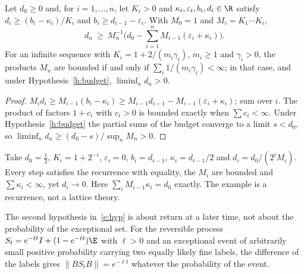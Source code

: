 \begin{corollary}[Accumulation]\label{c:acc}
Let $d_0\ge0$ and, for $i=1,\dots,n$, let $K_i>0$ and $\kappa_i,\varepsilon_i,b_i,d_i\in\R$ satisfy
$d_i\ge(b_i-\kappa_i)/K_i$ and $b_i\ge d_{i-1}-\varepsilon_i$. With $M_0=1$ and $M_i=K_1\cdots K_i$,
\[
d_n\ \ge\ M_n^{-1}\Big(d_0-\sum_{i=1}^nM_{i-1}(\varepsilon_i+\kappa_i)\Big).
\]
For an infinite sequence with $K_i=1+2/(m_i\gamma_i)$, $m_i\ge1$ and $\gamma_i>0$, the products $M_n$ are
bounded if and only if $\sum_i1/(m_i\gamma_i)<\infty$; in that case, and under Hypothesis~\ref{h:budget},
$\liminf_nd_n>0$.
\end{corollary}
\begin{proof}
$M_id_i\ge M_{i-1}(b_i-\kappa_i)\ge M_{i-1}d_{i-1}-M_{i-1}(\varepsilon_i+\kappa_i)$; sum over $i$. The product of
factors $1+c_i$ with $c_i>0$ is bounded exactly when $\sum c_i<\infty$. Under Hypothesis~\ref{h:budget} the
partial sums of the budget converge to a limit $s<d_0$, so $\liminf_nd_n\ge(d_0-s)/\sup_nM_n>0$.
\end{proof}

\begin{remark}\label{r:budget}
Take $d_0=\tfrac12$, $K_i=1+2^{-i}$, $\varepsilon_i=0$, $b_i=d_{i-1}$, $\kappa_i=d_{i-1}/2$ and
$d_i=d_0/(2^iM_i)$. Every step satisfies the recurrence with equality, the $M_i$ are bounded and
$\sum\kappa_i<\infty$, yet $d_i\to0$. Here $\sum_iM_{i-1}\kappa_i=d_0$ exactly. The example is a recurrence,
not a lattice theory.
\end{remark}

\begin{remark}\label{r:reset}
The second hypothesis in~\eqref{e:hyp} is about return at a later time, not about the probability of the
exceptional set. For the reversible process $S_t=e^{-\ell t}I+(1-e^{-\ell t})\E$ with $\ell>0$ and an exceptional event of
arbitrarily small positive probability carrying two equally likely fine labels, the difference of the labels
gives $\|BS_tB\|=e^{-\ell t}$ whatever the probability of the event.
\end{remark}

